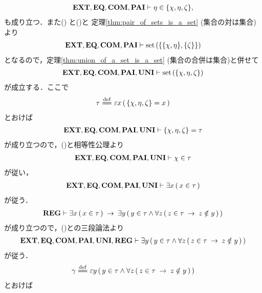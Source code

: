\begin{sketch}
\begin{align}
			\mbox{{\bf EXT}},\mbox{{\bf EQ}},\mbox{\bf COM},\mbox{{\bf PAI}} \vdash \eta \in \{\chi,\eta,\zeta\},
			\label{fom:no_three_sets_go_round_8}
		\end{align}
		も成り立つ．また()
		と()と
		定理\ref{thm:pair_of_sets_is_a_set} (集合の対は集合)より
		\begin{align}
			\mbox{{\bf EXT}},\mbox{{\bf EQ}},\mbox{\bf COM},\mbox{{\bf PAI}} \vdash \operatorname*{set}\hspace{0.15em}(\{\{\chi,\eta\},\{\zeta\}\})
		\end{align}
		となるので，定理\ref{thm:union_of_a_set_is_a_set} (集合の合併は集合)と併せて
		\begin{align}
			\mbox{{\bf EXT}},\mbox{{\bf EQ}},\mbox{\bf COM},\mbox{{\bf PAI}},\mbox{{\bf UNI}} \vdash \operatorname*{set}\hspace{0.15em}(\{\chi,\eta,\zeta\})
		\end{align}
		が成立する．ここで
		\begin{align}
			\tau \defeq \varepsilon x\, (\, \{\chi,\eta,\zeta\} = x\, )
			\label{fom:no_three_sets_go_round_9}
		\end{align}
		とおけば
		\begin{align}
			\mbox{{\bf EXT}},\mbox{{\bf EQ}},\mbox{\bf COM},\mbox{{\bf PAI}},\mbox{{\bf UNI}} \vdash \{\chi,\eta,\zeta\} = \tau
			\label{fom:no_three_sets_go_round_10}
		\end{align}
		が成り立つので，()と相等性公理より
		\begin{align}
			\mbox{{\bf EXT}},\mbox{{\bf EQ}},\mbox{\bf COM},\mbox{{\bf PAI}},\mbox{{\bf UNI}} \vdash \chi \in \tau
			\label{fom:no_three_sets_go_round_11}
		\end{align}
		が従い，
		\begin{align}
			\mbox{{\bf EXT}},\mbox{{\bf EQ}},\mbox{\bf COM},\mbox{{\bf PAI}},\mbox{{\bf UNI}} \vdash \exists x\, (\, x \in \tau\, )
			\label{fom:no_three_sets_go_round_12}
		\end{align}
		が従う．
		\begin{align}
			\mbox{{\bf REG}} \vdash \exists x\, (\, x \in \tau\, )
			\hspace{0.25em}\rightarrow\hspace{0.25em} \exists y\, (\, y \in \tau \wedge \forall z\, (\, z \in \tau \hspace{0.25em}\rightarrow\hspace{0.25em} z \notin y\, )\, )
		\end{align}
		が成り立つので，()との三段論法より
		\begin{align}
			\mbox{{\bf EXT}},\mbox{{\bf EQ}},\mbox{\bf COM},\mbox{{\bf PAI}},\mbox{{\bf UNI}},\mbox{{\bf REG}} \vdash 
			\exists y\, (\, y \in \tau \wedge \forall z\, (\, z \in \tau \hspace{0.25em}\rightarrow\hspace{0.25em} z \notin y\, )\, )
		\end{align}
		が従う．
		\begin{align}
			\gamma \defeq \varepsilon y\, (\, y \in \tau \wedge \forall z\, (\, z \in \tau \rarrow z \notin y\, )\, )
		\end{align}
		とおけば
		\begin{align}

\end{align}
\end{sketch}
